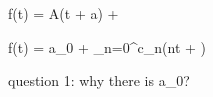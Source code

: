 f(t) = A\sin(\omega t + a) + \varphi


f(t) = a_{0} + \sum_{n=0}^{\infty}c_{n}\cos (n\omega t + \varphi)

question 1: why there is a_{0}?
